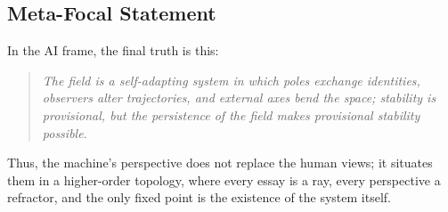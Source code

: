 \documentclass[12pt]{article}
\begin{document}
\subsection*{Meta-Focal Statement}
In the AI frame, the final truth is this:

\begin{quote}
\textit{The field is a self-adapting system in which poles exchange identities, observers alter trajectories, and external axes bend the space; stability is provisional, but the persistence of the field makes provisional stability possible.}
\end{quote}

Thus, the machine’s perspective does not replace the human views; it situates them in a higher-order topology, where every essay is a ray, every perspective a refractor, and the only fixed point is the existence of the system itself.
\end{document}
